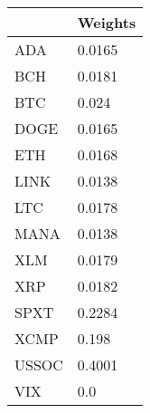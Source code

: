 \begin{tabular}{ll}
\toprule
 & Weights \\
\midrule
ADA & 0.0165 \\
BCH & 0.0181 \\
BTC & 0.024 \\
DOGE & 0.0165 \\
ETH & 0.0168 \\
LINK & 0.0138 \\
LTC & 0.0178 \\
MANA & 0.0138 \\
XLM & 0.0179 \\
XRP & 0.0182 \\
SPXT & 0.2284 \\
XCMP & 0.198 \\
USSOC & 0.4001 \\
VIX & 0.0 \\
\bottomrule
\end{tabular}
